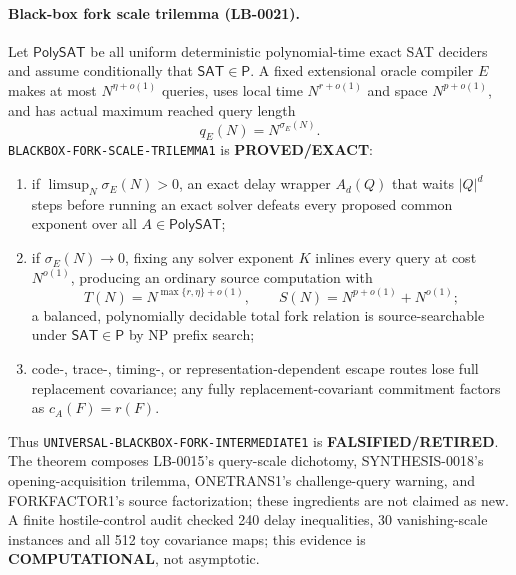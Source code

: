 \documentclass[11pt]{article}
\newcommand{\SAT}{\mathsf{SAT}}
\begin{document}
\paragraph{Black-box fork scale trilemma (LB-0021).}
Let \(\mathsf{PolySAT}\) be all uniform deterministic polynomial-time exact
SAT deciders and assume conditionally that \(\SAT\in\mathsf P\).  A fixed
extensional oracle compiler \(E\) makes at most \(N^{\eta+o(1)}\) queries,
uses local time \(N^{r+o(1)}\) and space \(N^{p+o(1)}\), and has actual
maximum reached query length
\[
 q_E(N)=N^{\sigma_E(N)}.
\]
\texttt{BLACKBOX-FORK-SCALE-TRILEMMA1} is \textbf{PROVED/EXACT}:
\begin{enumerate}
\item if \(\limsup_N\sigma_E(N)>0\), an exact delay wrapper
\(A_d(Q)\) that waits \(|Q|^d\) steps before running an exact solver defeats
every proposed common exponent over all \(A\in\mathsf{PolySAT}\);
\item if \(\sigma_E(N)\to0\), fixing any solver exponent \(K\) inlines every
query at cost \(N^{o(1)}\), producing an ordinary source computation with
\[
 T(N)=N^{\max\{r,\eta\}+o(1)},\qquad
 S(N)=N^{p+o(1)}+N^{o(1)};
\]
a balanced, polynomially decidable total fork relation is source-searchable
under \(\SAT\in\mathsf P\) by NP prefix search;
\item code-, trace-, timing-, or representation-dependent escape routes lose
full replacement covariance; any fully replacement-covariant commitment
factors as \(c_A(F)=r(F)\).
\end{enumerate}
Thus \texttt{UNIVERSAL-BLACKBOX-FORK-INTERMEDIATE1} is
\textbf{FALSIFIED/RETIRED}.  The theorem composes LB-0015's query-scale
dichotomy, SYNTHESIS-0018's opening-acquisition trilemma, ONETRANS1's
challenge-query warning, and FORKFACTOR1's source factorization; these
ingredients are not claimed as new.  A finite hostile-control audit checked
240 delay inequalities, 30 vanishing-scale instances and all 512 toy
covariance maps; this evidence is \textbf{COMPUTATIONAL}, not asymptotic.
\end{document}
